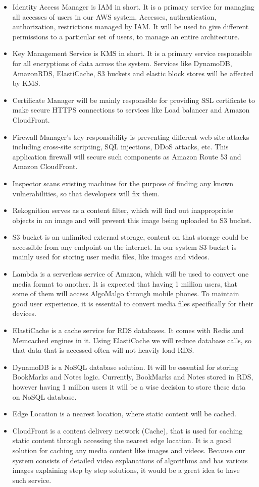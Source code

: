 \begin{itemize}
  \item Identity Access Manager is IAM in short. It is a primary service for managing all accesses of users in our AWS system. Accesses, authentication, authorization, restrictions managed by IAM. It will be used to give different permissions to a particular set of users, to manage an entire architecture.
  \item Key Management Service is KMS in short. It is a primary service responsible for all encryptions of data across the system. Services like DynamoDB, AmazonRDS, ElastiCache, S3 buckets and elastic block stores will be affected by KMS.
  \item Certificate Manager will be mainly responsible for providing SSL certificate to make secure HTTPS connections to services like Load balancer and Amazon CloudFront.
  \item Firewall Manager’s key responsibility is preventing different web site attacks including cross-site scripting, SQL injections, DDoS attacks, etc. This application firewall will secure such components as Amazon Route 53 and Amazon CloudFront.
  \item Inspector scans existing machines for the purpose of finding any known vulnerabilities, so that developers will fix them.
  \item Rekognition serves as a content filter, which will find out inappropriate objects in an image and will prevent this image being uploaded to S3 bucket.
  \item S3 bucket is an unlimited external storage, content on that storage could be accessible from any endpoint on the internet. In our system S3 bucket is mainly used for storing user media files, like images and videos.
  \item Lambda is a serverless service of Amazon, which will be used to convert one media format to another. It is expected that having 1 million users, that some of them will access AlgoMalgo through mobile phones. To maintain good user experience, it is essential to convert media files specifically for their devices.
  \item ElastiCache is a cache service for RDS databases. It comes with Redis and Memcached engines in it. Using ElastiCache we will reduce database calls, so that data that is accessed often will not heavily load RDS.
  \item DynamoDB is a NoSQL database solution. It will be essential for storing BookMarks and Notes logic. Currently, BookMarks and Notes stored in RDS, however having 1 million users it will be a wise decision to store these data on NoSQL database.
  \item Edge Location is a nearest location, where static content will be cached.
  \item CloudFront is a content delivery network (Cache), that is used for caching static content through accessing the nearest edge location. It is a good solution for caching any media content like images and videos. Because our system consists of detailed video explanations of algorithms and has various images explaining step by step solutions, it would be a great idea to have such service.
\end{itemize}

